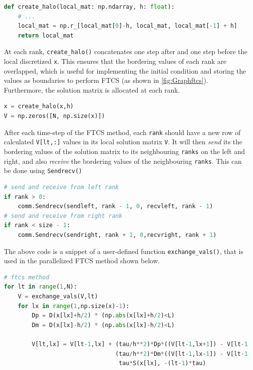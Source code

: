 \begin{lstlisting}[language=Python]
def create_halo(local_mat: np.ndarray, h: float):
    # ...
    local_mat = np.r_[local_mat[0]-h, local_mat, local_mat[-1] + h]
    return local_mat
\end{lstlisting}

\figHalo

At each rank, \texttt{create\_halo()} concatenates one step after and one step before the local discretized \texttt{x}. This ensures that the bordering values of each rank are overlapped, which is useful for implementing the initial condition and storing the values as boundaries to perform FTCS (as shown in \autoref{fig:Graphftcs}). Furthermore, the solution matrix is allocated at each rank.
\begin{lstlisting}[language=Python]
x = create_halo(x,h)
V = np.zeros([N, np.size(x)]) 
\end{lstlisting}

After each time-step of the FTCS method, each \texttt{rank} should have a new row of calculated \texttt{V[lt,:]} values in its local solution matrix \texttt{V}. It will then \textit{send} its the bordering values of the solution matrix to its neighbouring \texttt{ranks} on the left and right, and also \textit{receive} the bordering values of the neighbouring \texttt{ranks}. This can be done using \texttt{Sendrecv()}

\begin{lstlisting}[language=Python]
# send and receive from left rank
if rank > 0:
    comm.Sendrecv(sendleft, rank - 1, 0, recvleft, rank - 1)
# send and receive from right rank
if rank < size - 1:
    comm.Sendrecv(sendright, rank + 1, 0,recvright, rank + 1)
\end{lstlisting}

The above code is a snippet of a user-defined function \texttt{exchange\_vals()}, that is used in the parallelized FTCS method shown below.

\begin{lstlisting}[language=Python]
# ftcs method
for lt in range(1,N):
    V = exchange_vals(V,lt)
    for lx in range(1,np.size(x)-1):
        Dp = D(x[lx]+h/2) * (np.abs(x[lx]+h/2)<L)
        Dm = D(x[lx]-h/2) * (np.abs(x[lx]-h/2)<L)

        V[lt,lx] = V[lt-1,lx] + (tau/h**2)*Dp*((V[lt-1,lx+1]) - V[lt-1,lx])+\
                                (tau/h**2)*Dm*((V[lt-1,lx-1]) - V[lt-1,lx])+\
                                 tau*S(x[lx], -(lt-1)*tau)
\end{lstlisting}

